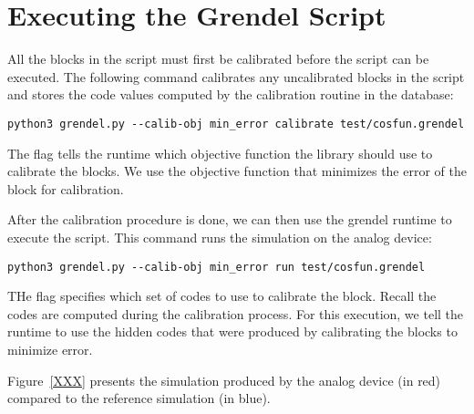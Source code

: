 \section{Executing the Grendel Script}

All the blocks in the  script must first be calibrated before
the script can be executed. The following command calibrates any uncalibrated
blocks in the script and stores the \hidden code values computed by the
calibration routine in the  database:

\begin{lstlisting}
python3 grendel.py --calib-obj min_error calibrate test/cosfun.grendel
\end{lstlisting}

The  flag
tells the \grendel runtime which objective function the \analoglib library
should use to calibrate the blocks. We use the objective function that minimizes
the error of the block for calibration. 

After the calibration procedure is done, we can then use the grendel runtime to
execute the script. This command runs the simulation on the analog device:

\begin{lstlisting}
python3 grendel.py --calib-obj min_error run test/cosfun.grendel
\end{lstlisting}

THe  flag specifies which set of \hidden codes to use to
calibrate the block. Recall the \hidden codes are computed during the
calibration process. For this execution, we tell the \grendel runtime to use the
hidden codes that were produced by calibrating the blocks to minimize error.

Figure~\ref{XXX} presents the simulation produced by the analog device (in red)
compared to the reference simulation (in blue). 